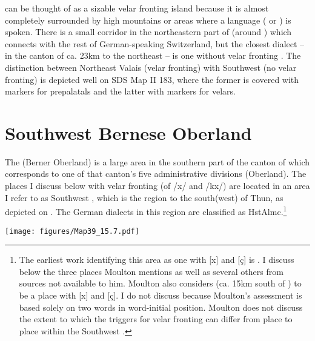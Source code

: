 { can be thought of as a sizable velar fronting island because it is almost completely surrounded by high mountains or areas where a  language ( or ) is spoken. There is a small corridor in the northeastern part of  (around ) which connects  with the rest of German-speaking Switzerland, but the closest dialect --  in the canton of  ca. 23km to the northeast -- is one without velar fronting \citep{Abegg1910}. The distinction between Northeast Valais (velar fronting) with Southwest  (no velar fronting) is depicted well on SDS Map II 183, where the former is covered with markers for prepalatals and the latter with markers for velars.

\section{{Southwest} {Bernese} {Oberland}}\label{sec:15.9}\largerpage

The  (Berner Oberland) is a large area in the southern part of the canton of  which corresponds to one of that canton’s five administrative divisions (Oberland). The places I discuss below with velar fronting (of /x/ and /kx/) are located in an area I refer to as Southwest , which is the region to the south(west) of Thun, as depicted on . The German dialects in this region are classified as HstAlmc.\footnote{{The earliest work identifying this area as one with [x] and [ç] is \citet[63]{Moulton1941}. I discuss below the three places Moulton mentions as well as several others from sources not available to him. Moulton also considers  (ca. 15km south of ) to be a place with [x] and [ç]. I do not discuss  because Moulton’s assessment is based solely on two words in word-initial position. Moulton does not discuss the extent to which the triggers for velar fronting can differ from place to place within the Southwest .}}

\begin{map}
\texttt{[image: figures/Map39\_15.7.pdf]}
\caption[Southwest {Bernese Oberland}]{Southwest . Squares indicate some version of velar fronting (postsonorant and/or word-initial), and circles indicate the absence of velar fronting. 1=\citet{Zahler1901} 2=\citet{Gröger1914c}, 3=\citet{Gröger1914d}, 4=\citet{Gröger1914e} 5=\citet{Stucki1917}, 6=\citet{Henzen1927}, 7=\citet{Marti1985}, 8=SDS, 9=SiWS.}\label{map:39}
\end{map}

}
